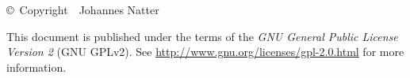 
\chapter*{}

\vspace{5cm}
\begin{center}
    \copyright\ Copyright\ \the\year\ Johannes Natter
\end{center}
\vspace{0.7cm}
This document is published under the terms of the \emph{GNU General Public License Version 2} (GNU GPLv2).
See \url{http://www.gnu.org/licenses/gpl-2.0.html} for more information.

